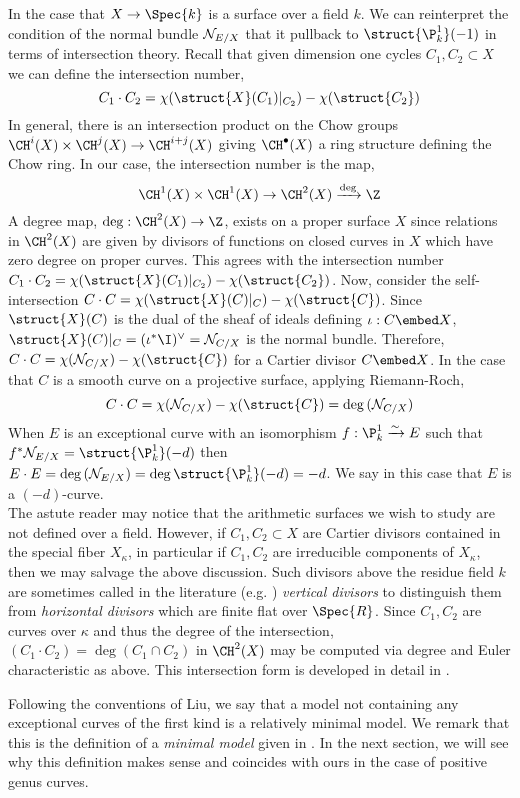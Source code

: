 \begin{rmk}
In the case that $X \to \Spec{k}$ is a surface over a field $k$. We can reinterpret the condition of the normal bundle $\mathcal{N}_{E/X}$ that it pullback to $\struct{\P^1_k}(-1)$ in terms of intersection theory. Recall that given dimension one cycles $C_1, C_2 \subset X$ we can define the intersection number,
\[ C_1 \cdot C_2 = \chi(\struct{X}(C_1)|_{C_2}) - \chi(\struct{C_2}) \]
In general, there is an intersection product on the Chow groups $\CH^i(X) \times \CH^j(X) \to \CH^{i+j}(X)$ giving $\CH^\bullet(X)$ a ring structure defining the Chow ring. In our case, the intersection number is the map,
\[ \CH^{1}(X) \times \CH^{1}(X) \to \CH^2(X) \xrightarrow{\deg} \Z \]
A degree map, $\deg : \CH^2(X) \to \Z$, exists on a proper surface $X$ since relations in $\CH^2(X)$ are given by divisors of functions on closed curves in $X$ which have zero degree on proper curves. This agrees with the intersection number $C_1 \cdot C_2 = \chi(\struct{X}(C_1)|_{C_2}) - \chi(\struct{C_2})$. Now, consider the self-intersection $C \cdot C = \chi(\struct{X}(C)|_C) - \chi(\struct{C})$. Since $\struct{X}(C)$ is the dual of the sheaf of ideals defining $\iota : C \embed X$, $\struct{X}(C)|_C = (\iota^* \I)^\vee = \N_{C/X}$ is the normal bundle. Therefore, $C \cdot C = \chi(\N_{C/X}) - \chi(\struct{C})$ for a Cartier divisor $C \embed X$. In the case that $C$ is a smooth curve on a projective surface, applying Riemann-Roch,
\[ C \cdot C = \chi(\N_{C/X}) - \chi(\struct{C}) = \deg{(\N_{C/X})} \]
When $E$ is an exceptional curve with an isomorphism $f : \P^1_k \xrightarrow{\sim} E$ such that $f^* \N_{E/X} = \struct{\P^1_k}(-d)$ then $E \cdot E = \deg{(\N_{E/X})} = \deg{\struct{\P^1_k}(-d)} = -d$. We say in this case that $E$ is a $(-d)$-curve. 
\bigskip\\
The astute reader may notice that the arithmetic surfaces we wish to study are not defined over a field. However, if $C_1, C_2 \subset X$ are Cartier divisors contained in the special fiber $X_\kappa$, in particular if $C_1, C_2$ are irreducible components of $X_\kappa$, then we may salvage the above discussion. Such divisors above the residue field $k$ are sometimes called in the literature (e.g. \cite{romagny_models}) \textit{vertical divisors} to distinguish them from \textit{horizontal divisors} which are finite flat over $\Spec{R}$. Since $C_1, C_2$ are curves over $\kappa$ and thus the degree of the intersection, $(C_1 \cdot C_2) = \deg{(C_1 \cap C_2)}$ in $\CH^2(X)$ may be computed via degree and Euler characteristic as above. This intersection form is developed in detail in \cite[\href{https://stacks.math.columbia.edu/tag/0C5Y}{Tag 0C5Y}]{stacks-project}.
\end{rmk}
\noindent
Following the conventions of Liu, we say that a model not containing any exceptional curves of the first kind is a relatively minimal model. We remark that this is the definition of a \textit{minimal model} given in \cite[\href{https://stacks.math.columbia.edu/tag/0C2R}{Tag 0C2R}]{stacks-project}. In the next section, we will see why this definition makes sense and coincides with ours in the case of positive genus curves.

